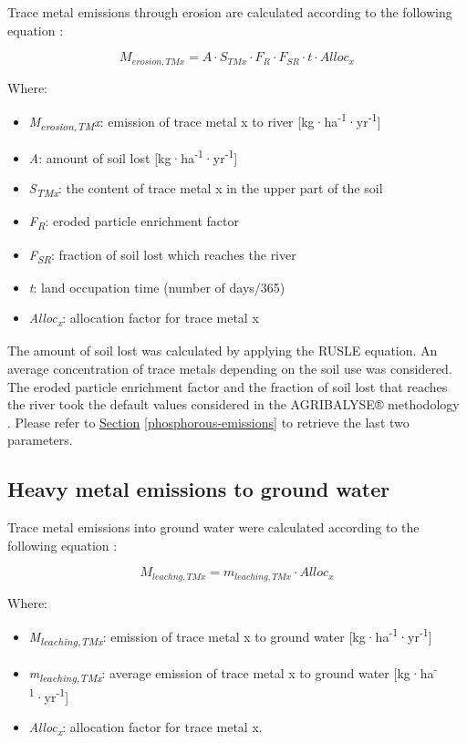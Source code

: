 \documentclass[openany]{book}
\begin{document}
Trace metal emissions through erosion are calculated according to the following equation \citep{Koch2015}:

\[M_{erosion,TMx} = A \cdot S_{TMx} \cdot F_R \cdot F_{SR} \cdot t \cdot Alloc_x\]

Where:

\begin{itemize}
\item
  \emph{M\textsubscript{erosion,TM}x}: emission of trace metal x to river {[}kg·ha\textsuperscript{-1}·yr\textsuperscript{-1}{]}
\item
  \emph{A}: amount of soil lost {[}kg·ha\textsuperscript{-1}·yr\textsuperscript{-1}{]}
\item
  \emph{S\textsubscript{TMx}}: the content of trace metal x in the upper part of the soil
\item
  \emph{F\textsubscript{R}}: eroded particle enrichment factor
\item
  \emph{F\textsubscript{SR}}: fraction of soil lost which reaches the river
\item
  \emph{t}: land occupation time (number of days/365)
\item
  \emph{Alloc\textsubscript{x}}: allocation factor for trace metal x
\end{itemize}

The amount of soil lost was calculated by applying the RUSLE equation. An average concentration of trace metals depending on the soil use was considered. The eroded particle enrichment factor and the fraction of soil lost that reaches the river took the default values considered in the AGRIBALYSE® methodology \citep{Koch2015}. Please refer to \protect\hyperlink{phosphorous-emissions}{Section} \ref{phosphorous-emissions} to retrieve the last two parameters.

\hypertarget{heavy-metal-emissions-to-ground-water}{%
\subsection{Heavy metal emissions to ground water}\label{heavy-metal-emissions-to-ground-water}}

Trace metal emissions into ground water were calculated according to the following equation \citep{Koch2015}:

\[M_{leachng,TMx} = m_{leaching,TMx} \cdot Alloc_x\]

Where:

\begin{itemize}
\item
  \emph{M\textsubscript{leaching,TMx}}: emission of trace metal x to ground water {[}kg·ha\textsuperscript{-1}·yr\textsuperscript{-1}{]}
\item
  \emph{m\textsubscript{leaching,TMx}}: average emission of trace metal x to ground water {[}kg·ha\textsuperscript{-1}·yr\textsuperscript{-1}{]}
\item
  \emph{Alloc\textsubscript{x}}: allocation factor for trace metal x.
\end{itemize}


\end{document}
